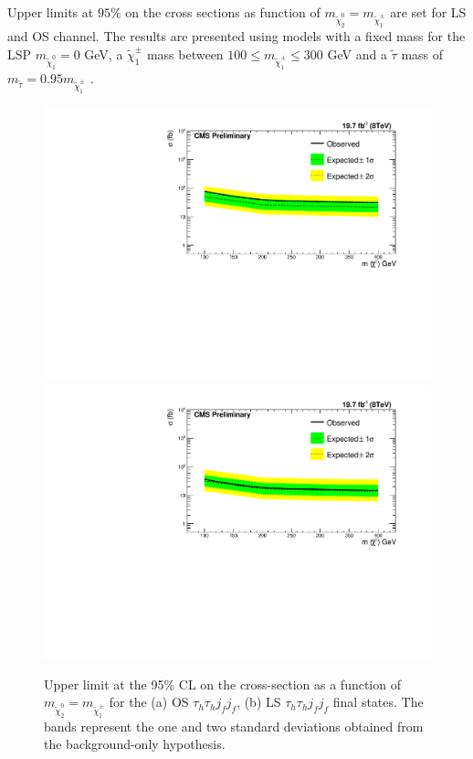 Upper limits at $95\%$ on the cross sections as function of $m_{\tilde{\chi}_{2}^{0}}=m_{\tilde{\chi}_{1}^{\pm}}$ are set for LS and OS channel. The results are presented using models with a fixed mass for the LSP $m_{\tilde{\chi}_{1}^{0}} = 0 $ GeV, a $\tilde{\chi}_{1}^{\pm}$ mass between $100 \leq m_{\tilde{\chi}_{1}^{\pm}} \leq 300$ GeV and a $\tilde{\tau}$ mass of $m_{\tilde{\tau}} = 0.95 m_{\tilde{\chi}_{1}^{\pm}}$ .

\begin{figure}
  \begin{center}
    \includegraphics[angle=0,width=.48\textwidth, height=0.35\textheight]{PLOTS/Limit_VBF_diTau_OS.pdf}
    \includegraphics[angle=0,width=.48\textwidth, height=0.35\textheight]{PLOTS/Limit_VBF_diTau_LS.pdf}
    \caption{Upper limit at the 95\% CL on the cross-section as a function of 
$m_{\tilde{\chi}_{2}^{0}}=m_{\tilde{\chi}_{1}^{\pm}}$ for the (a) OS 
$\tau_{h}\tau_{h} j_{f} j_{f}$, (b) LS $\tau_{h}\tau_{h} j_{f} j_{f}$
final states. The bands represent the one and two standard deviations obtained from the background-only hypothesis.}
  \label{fig:LimitsOSLS}
 \end{center}
\end{figure}

